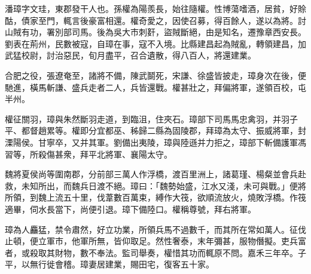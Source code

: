 \begin{pinyinscope}
 
 
 潘璋字文珪，東郡發干人也。孫權為陽羨長，始往隨權。性博蕩嗜酒，居貧，好賒酤，債家至門，輒言後豪富相還。權奇愛之，因使召募，得百餘人，遂以為將。討山賊有功，署別部司馬。後為吳大巿刺姧，盜賊斷絕，由是知名，遷豫章西安長。劉表在荊州，民數被寇，自璋在事，寇不入境。比縣建昌起為賊亂，轉領建昌，加武猛校尉，討治惡民，旬月盡平，召合遺散，得八百人，將還建業。
 
 
 
 
 合肥之役，張遼奄至，諸將不備，陳武鬬死，宋謙、徐盛皆披走，璋身次在後，便馳進，橫馬斬謙、盛兵走者二人，兵皆還戰。權甚壯之，拜偏將軍，遂領百校，屯半州。
 
 
 
 
 權征關羽，璋與朱然斷羽走道，到臨沮，住夾石。璋部下司馬馬忠禽羽，并羽子平、都督趙累等。權即分宜都巫、秭歸二縣為固陵郡，拜璋為太守、振威將軍，封溧陽侯。甘寧卒，又并其軍。劉備出夷陵，璋與陸遜并力拒之，璋部下斬備護軍馮習等，所殺傷甚衆，拜平北將軍、襄陽太守。
 
 
 
 
 魏將夏侯尚等圍南郡，分前部三萬人作浮橋，渡百里洲上，諸葛瑾、楊粲並會兵赴救，未知所出，而魏兵日渡不絕。璋曰：「魏勢始盛，江水又淺，未可與戰。」便將所領，到魏上流五十里，伐葦數百萬束，縛作大筏，欲順流放火，燒敗浮橋。作筏適畢，伺水長當下，尚便引退。璋下備陸口。權稱尊號，拜右將軍。
 
 
 
 
 璋為人麤猛，禁令肅然，好立功業，所領兵馬不過數千，而其所在常如萬人。征伐止頓，便立軍巿，他軍所無，皆仰取足。然性奢泰，末年彌甚，服物僭擬。吏兵富者，或殺取其財物，數不奉法。監司舉奏，權惜其功而輒原不問。嘉禾三年卒。子平，以無行徙會稽。璋妻居建業，賜田宅，復客五十家。
 
 
\end{pinyinscope}